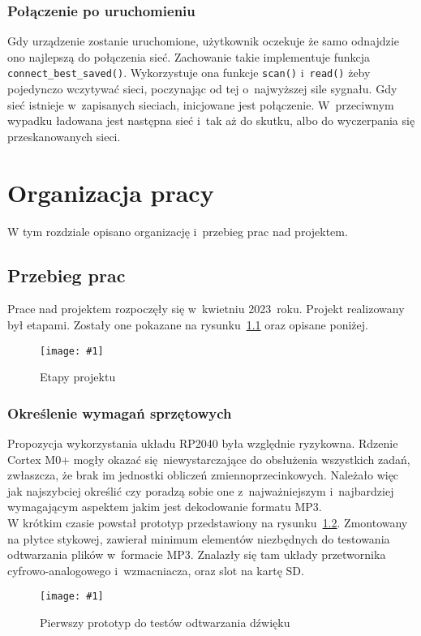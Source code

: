 \documentclass[polish]{aghengthesis}
\newcommand{\imgint}[4]{
	\begin{figure}[{#4}]
		\centering
		\texttt{[image: \#1]}
		\caption{#2}
		\label{#1}
	\end{figure}
}
\newcommand{\imgh}[3]{\imgint{#1}{#2}{#3}{H}}
\begin{document}
		\subsection{Połączenie po uruchomieniu}
			Gdy urządzenie zostanie uruchomione, użytkownik oczekuje że samo odnajdzie ono najlepszą do połączenia sieć. Zachowanie takie implementuje funkcja \lstinline|connect_best_saved()|. Wykorzystuje ona funkcje \lstinline|scan()| i~\lstinline|read()| żeby pojedynczo wczytywać sieci, poczynając od tej o~najwyższej sile sygnału. Gdy sieć istnieje w~zapisanych sieciach, inicjowane jest połączenie. W~przeciwnym wypadku ładowana jest następna sieć i~tak aż do skutku, albo do wyczerpania się przeskanowanych sieci.
			
\cleardoublepage
\chapter{Organizacja pracy}
	W tym rozdziale opisano organizację i~przebieg prac nad projektem.
	
	\section{Przebieg prac}
		Prace nad projektem rozpoczęły się w~kwietniu 2023~roku. Projekt realizowany był etapami. Zostały one pokazane na rysunku~\ref{4/PicoRadio-steps} oraz opisane poniżej.
		
		\imgh{4/PicoRadio-steps}{Etapy projektu}{1}
		
		\subsection{Określenie wymagań sprzętowych}
			Propozycja wykorzystania układu RP2040 była względnie ryzykowna. Rdzenie Cortex M0+ mogły okazać się niewystarczające do obsłużenia wszystkich zadań, zwłaszcza, że brak im jednostki obliczeń zmiennoprzecinkowych. Należało więc jak najszybciej określić czy poradzą sobie one z~najważniejszym i~najbardziej wymagającym aspektem jakim jest dekodowanie formatu MP3.
			$ $\\
			
			W krótkim czasie powstał prototyp przedstawiony na rysunku~\ref{4/prototype_1}. Zmontowany na płytce stykowej, zawierał minimum elementów niezbędnych do testowania odtwarzania plików w~formacie MP3. Znalazły się tam układy przetwornika cyfrowo-analogowego i~wzmacniacza, oraz slot na kartę SD.
			
			\imgh{4/prototype_1}{Pierwszy prototyp do testów odtwarzania dźwięku}{0.6}
			
\end{document}
